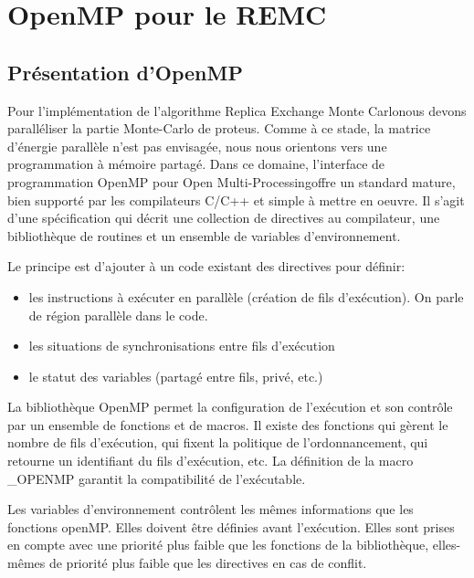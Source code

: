 \section{OpenMP pour le REMC}
\subsection{Présentation d'OpenMP}

Pour l'implémentation de l'algorithme \og Replica Exchange Monte Carlo\fg nous devons paralléliser la partie Monte-Carlo de proteus. Comme à ce stade, la matrice d'énergie parallèle n'est pas envisagée, nous nous orientons vers une programmation à mémoire partagé. Dans ce domaine, l'interface de programmation OpenMP pour \og Open Multi-Processing\fg  offre un standard mature, bien supporté par les compilateurs C/C++ et simple à mettre en oeuvre. Il s'agit d'une spécification qui décrit une collection de directives au compilateur, une bibliothèque de routines et un ensemble de variables d'environnement. 


Le principe est d'ajouter à un code existant des directives pour définir:

\begin{itemize}
\item les instructions à exécuter en parallèle (création de fils d'exécution). On parle de région parallèle dans le code.
\item les situations de synchronisations entre fils d'exécution
\item le statut des variables (partagé entre fils, privé, etc.) 
\end{itemize}

La bibliothèque OpenMP permet la configuration de l'exécution et son contrôle par un ensemble de fonctions et de macros. Il existe des fonctions qui gèrent le nombre de fils d'exécution, qui fixent la politique de l'ordonnancement, qui retourne un identifiant du fils d'exécution, etc. La définition de la macro \_OPENMP garantit la compatibilité de l'exécutable.

Les variables d'environnement contrôlent les mêmes informations que les fonctions openMP. Elles doivent être définies avant l'exécution. Elles sont prises en compte avec une priorité plus faible que les fonctions de la bibliothèque, elles-mêmes de priorité plus faible que les directives en cas de conflit.

